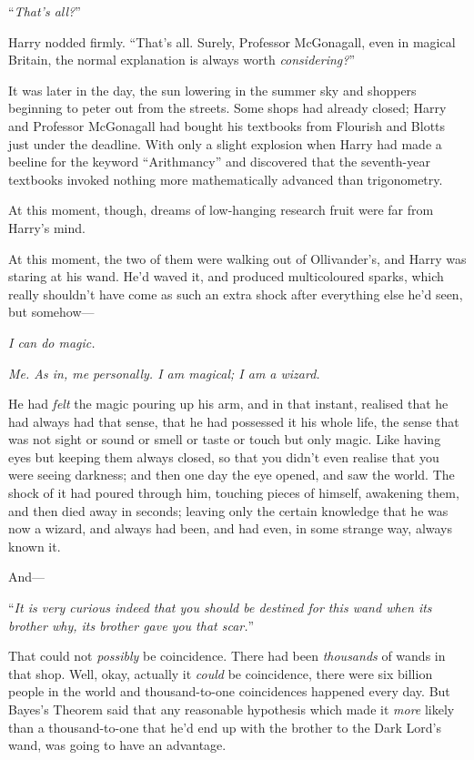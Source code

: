 “\emph{That’s all?}”

Harry nodded firmly. “That’s all. Surely, Professor McGonagall, even in magical Britain, the normal explanation is always worth \emph{considering?}”

\later

It was later in the day, the sun lowering in the summer sky and shoppers beginning to peter out from the streets. Some shops had already closed; Harry and Professor McGonagall had bought his textbooks from Flourish and Blotts just under the deadline. With only a slight explosion when Harry had made a beeline for the keyword “Arithmancy” and discovered that the seventh-year textbooks invoked nothing more mathematically advanced than trigonometry.

At this moment, though, dreams of low-hanging research fruit were far from Harry’s mind.

At this moment, the two of them were walking out of Ollivander’s, and Harry was staring at his wand. He’d waved it, and produced multicoloured sparks, which really shouldn’t have come as such an extra shock after everything else he’d seen, but somehow—

\emph{I can do magic.}

\emph{Me. As in, me personally. I am magical; I am a wizard.}

He had \emph{felt} the magic pouring up his arm, and in that instant, realised that he had always had that sense, that he had possessed it his whole life, the sense that was not sight or sound or smell or taste or touch but only magic. Like having eyes but keeping them always closed, so that you didn’t even realise that you were seeing darkness; and then one day the eye opened, and saw the world. The shock of it had poured through him, touching pieces of himself, awakening them, and then died away in seconds; leaving only the certain knowledge that he was now a wizard, and always had been, and had even, in some strange way, always known it.

And—

“\emph{It is very curious indeed that you should be destined for this wand when its brother why, its brother gave you that scar.}”

That could not \emph{possibly} be coincidence. There had been \emph{thousands} of wands in that shop. Well, okay, actually it \emph{could} be coincidence, there were six billion people in the world and thousand-to-one coincidences happened every day. But Bayes’s Theorem said that any reasonable hypothesis which made it \emph{more} likely than a thousand-to-one that he’d end up with the brother to the Dark Lord’s wand, was going to have an advantage.

